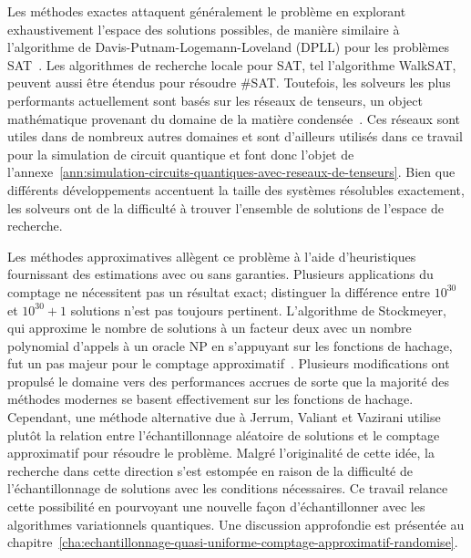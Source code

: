 Les méthodes exactes attaquent généralement le problème en explorant exhaustivement l'espace des solutions possibles, de manière similaire à l'algorithme de Davis-Putnam-Logemann-Loveland (DPLL) pour les problèmes SAT~\cite{davisMachineProgramTheoremproving1962}. Les algorithmes de recherche locale pour SAT, tel l'algorithme WalkSAT, peuvent aussi être étendus pour résoudre \#SAT. Toutefois, les solveurs les plus performants actuellement sont basés sur les réseaux de tenseurs, un object mathématique provenant du domaine de la matière condensée~\cite{kourtisFastCountingTensor2019, dudekEfficientContractionLarge2020, dudekParallelWeightedModel2021}. Ces réseaux sont utiles dans de nombreux autres domaines et sont d'ailleurs utilisés dans ce travail pour la simulation de circuit quantique et font donc l'objet de l'annexe~\ref{ann:simulation-circuits-quantiques-avec-reseaux-de-tenseurs}. Bien que différents développements accentuent la taille des systèmes résolubles exactement, les solveurs ont de la difficulté à trouver l'ensemble de solutions de l'espace de recherche. 

Les méthodes approximatives allègent ce problème à l'aide d'heuristiques fournissant des estimations avec ou sans garanties. Plusieurs applications du comptage ne nécessitent pas un résultat exact; distinguer la différence entre $10^{30}$ et $10^{30}+1$ solutions n'est pas toujours pertinent. L'algorithme de Stockmeyer, qui approxime le nombre de solutions à un facteur deux avec un nombre polynomial d'appels à un oracle \textsf{NP} en s'appuyant sur les fonctions de hachage, fut un pas majeur pour le comptage approximatif~\cite{stockmeyerComplexityApproximateCounting1983}. Plusieurs modifications ont propulsé le domaine vers des performances accrues de sorte que la majorité des méthodes modernes se basent effectivement sur les fonctions de hachage. Cependant, une méthode alternative due à Jerrum, Valiant et Vazirani utilise plutôt la relation entre l'échantillonnage aléatoire de solutions et le comptage approximatif pour résoudre le problème. Malgré l'originalité de cette idée, la recherche dans cette direction s'est estompée en raison de la difficulté de l'échantillonnage de solutions avec les conditions nécessaires. Ce travail relance cette possibilité en pourvoyant une nouvelle façon d'échantillonner avec les algorithmes variationnels quantiques. Une discussion approfondie est présentée au chapitre~\ref{cha:echantillonnage-quasi-uniforme-comptage-approximatif-randomise}.

